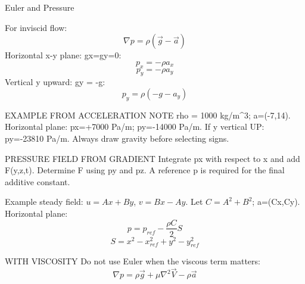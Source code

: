Euler and Pressure

For inviscid flow:
$$\nabla p=\rho(\vec g-\vec a)$$
Horizontal x-y plane: gx=gy=0:
$$p_x=-\rho a_x$$
$$p_y=-\rho a_y$$
Vertical y upward: gy = -g:
$$p_y=\rho(-g-a_y)$$

EXAMPLE FROM ACCELERATION NOTE
rho = 1000 kg/m^3; a=(-7,14).
Horizontal plane: px=+7000 Pa/m; py=-14000 Pa/m.
If y vertical UP: py=-23810 Pa/m.
Always draw gravity before selecting signs.

PRESSURE FIELD FROM GRADIENT
Integrate px with respect to x and add F(y,z,t). Determine F using py and pz. A reference p is required for the final additive constant.

Example steady field:
$u=Ax+By$, $v=Bx-Ay$.
Let $C=A^2+B^2$; a=(Cx,Cy).
Horizontal plane:
$$p=p_{ref}-\frac{\rho C}{2}S$$
$$S=x^2-x_{ref}^2+y^2-y_{ref}^2$$

WITH VISCOSITY
Do not use Euler when the viscous term matters:
$$\nabla p=\rho\vec g+\mu\nabla^2\vec V-\rho\vec a$$

